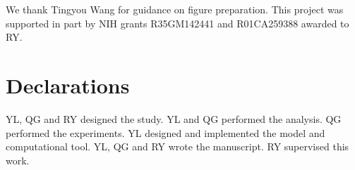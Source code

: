 \documentclass[pdflatex,sn-nature]{sn-jnl}%
\theoremstyle{thmstyleone}%
\theoremstyle{thmstyletwo}%
\theoremstyle{thmstylethree}%
\begin{document}


We thank Tingyou Wang for guidance on figure preparation.
This project was supported in part by NIH grants R35GM142441 and R01CA259388 awarded to RY.

\section*{Declarations}


YL, QG and RY designed the study.
YL and QG performed the analysis.
QG performed the experiments.
YL designed and implemented the model and computational tool.
YL, QG and RY wrote the manuscript.
RY supervised this work.
\end{document}
